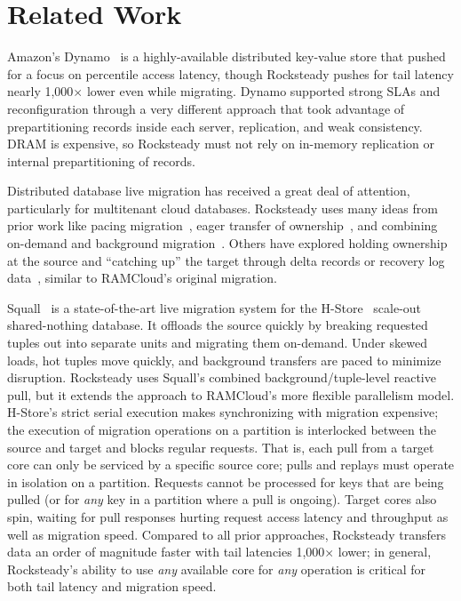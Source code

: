 \section{Related Work}

Amazon's Dynamo~\cite{dynamo} is a highly-available distributed key-value store
that pushed for a focus on \nnnth percentile access latency, though Rocksteady
pushes for tail latency nearly 1,000$\times$ lower even while migrating. Dynamo
supported strong SLAs and reconfiguration through a very different approach
that took advantage of prepartitioning records inside each server, replication,
and weak consistency. DRAM is expensive, so Rocksteady must not rely on
in-memory replication or internal prepartitioning of records.

Distributed database live migration has received a great deal of attention,
particularly for multitenant cloud databases. Rocksteady uses many ideas from
prior work like pacing migration~\cite{slacker}, eager transfer of
ownership~\cite{zephyr,squall}, and combining on-demand and background
migration~\cite{squall,zephyr,prorea}. Others have explored holding ownership
at the source and ``catching up'' the target through delta records or recovery
log data~\cite{albatross}, similar to RAMCloud's original migration.

Squall~\cite{squall,estore} is a state-of-the-art live migration system for the
H-Store~\cite{hstore} scale-out shared-nothing database. It offloads the source
quickly by breaking requested tuples out into separate units and migrating
them on-demand. Under skewed loads, hot tuples move quickly, and background
transfers are paced to minimize disruption. Rocksteady uses Squall's
combined background/tuple-level reactive pull, but it extends the approach to
RAMCloud's more flexible parallelism model.
H-Store's strict serial execution makes synchronizing with migration expensive;
the execution of migration operations on a partition
is interlocked between the source and target and blocks regular
requests.  That is, each pull from a target core can only be serviced by a
specific source core; pulls and replays must operate in
isolation on a partition. Requests cannot be processed for keys that are
being pulled (or for {\em any} key in a partition where a pull is ongoing).
Target cores also spin, waiting for pull responses hurting
request access latency and throughput as well as migration speed.
Compared to all prior approaches, Rocksteady transfers data an order of
magnitude faster with tail latencies 1,000$\times$ lower; in general,
Rocksteady's ability to use {\em any} available core for {\em any} operation is
critical for both tail latency and migration speed.

